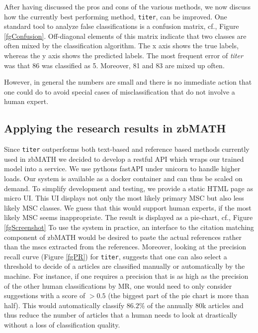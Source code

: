 After having discussed the pros and cons of the various methods, we now discuss how the currently best performing method, \texttt{titer}, can be improved. 
One standard tool to analyze false classifications
is a confusion matrix, cf., Figure \ref{fgConfusion}.
Off-diagonal elements of this matrix indicate that two classes are often mixed by the classification algorithm.
The x axis shows the true labels, whereas the y axis shows the predicted labels.
The most frequent error of \textit{titer} was that 86 was classified as 5.
Moreover, 81 and 83 are mixed up often.

However, in general the numbers
are small and there is no immediate action that one could do to avoid special cases of misclassification that do not involve a human expert.

\subsection{Applying the research results in zbMATH}
Since \texttt{titer} outperforms both text-based and reference based methods currently used in zbMATH we decided to develop a restful API which wraps our trained model into a service.
We use pythons fastAPI under unicorn to handle higher loads.
Our system is available as a docker container and can thus be scaled on demand.
To simplify development and testing, we provide a static HTML page as micro UI.
This UI displays not only the most likely primary MSC but also less likely MSC classes.
We guess that this would support human experts, 
if the most likely MSC seems inappropriate.
The result is displayed as a pie-chart, cf., Figure \ref{fgScreenshot}
To use the system in practice, an interface to the citation matching component of zbMATH would be desired to paste the actual references rather than the mscs extracted from the references.
Moreover, looking at the precision recall curve (Figure \ref{fgPR}) for \texttt{titer}, suggests that one can also select a threshold to decide of a articles
are classified manually or automatically by the machine.
For instance, if one requires a precision that is as high as the precision of the other human classifications by MR, one would need to only consider suggestions with a score of $>0.5$ (the biggest
part of the pie chart is more than half). This would automatically classify $86.2\%$ of the annually 80k articles and thus reduce the number of articles that a human needs to look at drastically without a loss of classification quality.

